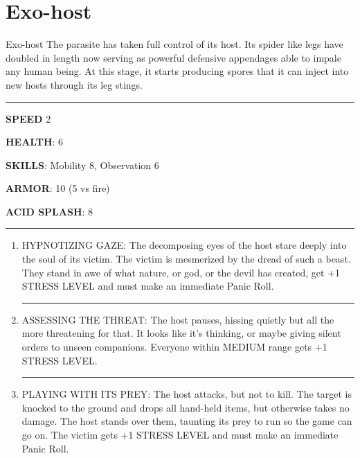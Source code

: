 \section{Exo-host}

\begin{rpg-commentbox}{Exo-host}
    The parasite has taken full control of its host. Its spider like legs have doubled in length now serving as powerful defensive appendages able to impale any human being. At this stage, it starts producing spores that it can inject into new hosts through its leg stings. 
\end{rpg-commentbox}    


\begin{rpg-commentbox}{}


    \par\noindent\rule{\textwidth}{0.4pt}

    \textbf{SPEED} 2

    \textbf{HEALTH}: 6

    \textbf{SKILLS}: Mobility 8, Observation 6
    
    \textbf{ARMOR}: 10 (5 vs fire)
    
    \textbf{ACID SPLASH}: 8

    \par\noindent\rule{\textwidth}{0.4pt}

    \begin{small}
    \begin{enumerate}
        \item HYPNOTIZING GAZE: The decomposing eyes of the host stare deeply into the soul of its
        victim. The victim is mesmerized by the dread of such a beast. They stand in awe of
        what nature, or god, or the devil has created, get +1 STRESS LEVEL and must make an immediate Panic Roll.

        \par\noindent\rule{.9\textwidth}{0.4pt}
        
        \item  ASSESSING THE THREAT: The host pauses, hissing quietly but all the more threatening
        for that. It looks like it’s thinking, 
        or maybe giving silent orders to unseen companions. Everyone within MEDIUM range gets +1 STRESS LEVEL.

        \par\noindent\rule{.9\textwidth}{0.4pt}

        \item PLAYING WITH ITS PREY: The host attacks, but not to kill. The target is knocked to the ground
        and drops all hand-held items, but otherwise takes no damage. The host stands over
        them, taunting its prey to run so the game can go on. The victim gets +1 STRESS LEVEL and
        must make an immediate Panic Roll.
        

\end{enumerate}
\end{small}
\end{rpg-commentbox}
